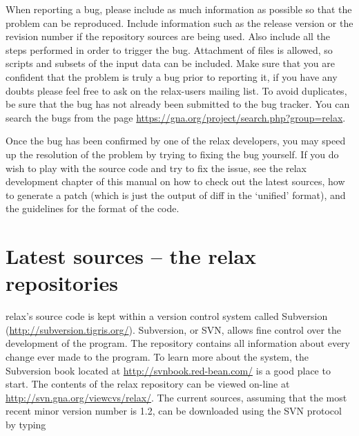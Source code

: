 When reporting a bug, please include as much information as possible so that the problem can be reproduced.  Include information such as the release version or the revision number if the repository sources are being used.  Also include all the steps performed in order to trigger the bug.  Attachment of files is allowed, so scripts and subsets of the input data can be included.  Make sure that you are confident that the problem is truly a bug prior to reporting it, if you have any doubts please feel free to ask on the relax-users mailing list.  To avoid duplicates, be sure that the bug has not already been submitted to the bug tracker.  You can search the bugs from the page \href{https://gna.org/project/search.php?group=relax}{https://gna.org/project/search.php?group=relax}.

Once the bug has been confirmed by one of the relax developers, you may speed up the resolution of the problem by trying to fixing the bug yourself.  If you do wish to play with the source code and try to fix the issue, see the relax development chapter of this manual on how to check out the latest sources, how to generate a patch (which is just the output of diff in the `unified' format), and the guidelines for the format of the code.




\section{Latest sources -- the relax repositories}

relax's source code is kept within a version control system called Subversion (\href{http://subversion.tigris.org/}{http://subversion.tigris.org/}).  Subversion, or SVN, allows fine control over the development of the program.  The repository contains all information about every change ever made to the program.  To learn more about the system, the Subversion book located at \href{http://svnbook.red-bean.com/}{http://svnbook.red-bean.com/} is a good place to start.  The contents of the relax repository can be viewed on-line at \href{http://svn.gna.org/viewcvs/relax/}{http://svn.gna.org/viewcvs/relax/}.  The current sources, assuming that the most recent minor version number is 1.2, can be downloaded using the SVN protocol by typing


